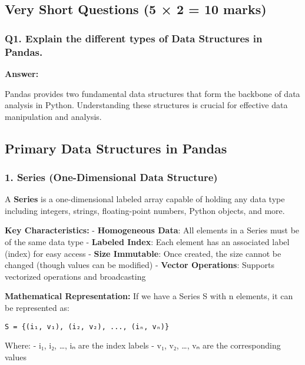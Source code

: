 \documentclass[11pt]{article}
\begin{document}
    \subsection{Very Short Questions (5 × 2 = 10
marks)}\label{very-short-questions-5-2-10-marks}

\subsubsection{Q1. Explain the different types of Data Structures in
Pandas.}\label{q1.-explain-the-different-types-of-data-structures-in-pandas.}

    \textbf{Answer:}

Pandas provides two fundamental data structures that form the backbone
of data analysis in Python. Understanding these structures is crucial
for effective data manipulation and analysis.

\subsection{Primary Data Structures in
Pandas}\label{primary-data-structures-in-pandas}

\subsubsection{1. Series (One-Dimensional Data
Structure)}\label{series-one-dimensional-data-structure}

A \textbf{Series} is a one-dimensional labeled array capable of holding
any data type including integers, strings, floating-point numbers,
Python objects, and more.

\textbf{Key Characteristics:} - \textbf{Homogeneous Data}: All elements
in a Series must be of the same data type - \textbf{Labeled Index}: Each
element has an associated label (index) for easy access - \textbf{Size
Immutable}: Once created, the size cannot be changed (though values can
be modified) - \textbf{Vector Operations}: Supports vectorized
operations and broadcasting

\textbf{Mathematical Representation:} If we have a Series S with n
elements, it can be represented as:

\begin{verbatim}
S = {(i₁, v₁), (i₂, v₂), ..., (iₙ, vₙ)}
\end{verbatim}

Where: - i₁, i₂, \ldots, iₙ are the index labels - v₁, v₂, \ldots, vₙ
are the corresponding values
\end{document}
